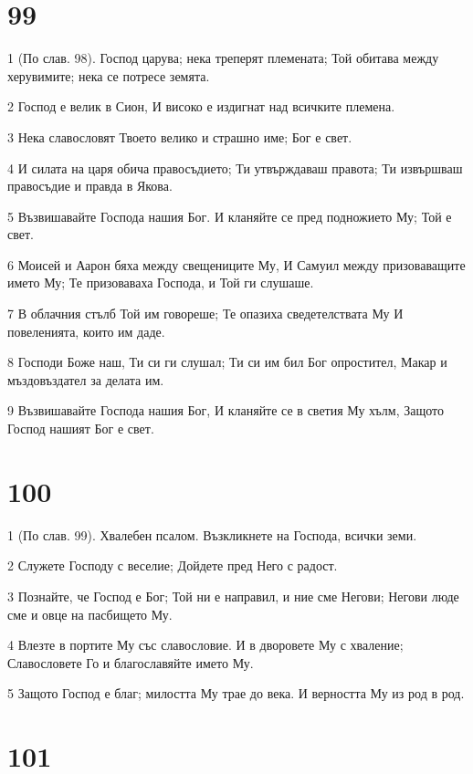\chapter{99}

\par 1 (По слав. 98). Господ царува; нека треперят племената; Той обитава между херувимите; нека се потресе земята.
\par 2 Господ е велик в Сион, И високо е издигнат над всичките племена.
\par 3 Нека славословят Твоето велико и страшно име; Бог е свет.
\par 4 И силата на царя обича правосъдието; Ти утвърждаваш правота; Ти извършваш правосъдие и правда в Якова.
\par 5 Възвишавайте Господа нашия Бог. И кланяйте се пред подножието Му; Той е свет.
\par 6 Моисей и Аарон бяха между свещениците Му, И Самуил между призоваващите името Му; Те призоваваха Господа, и Той ги слушаше.
\par 7 В облачния стълб Той им говореше; Те опазиха сведетелствата Му И повеленията, които им даде.
\par 8 Господи Боже наш, Ти си ги слушал; Ти си им бил Бог опростител, Макар и мъздовъздател за делата им.
\par 9 Възвишавайте Господа нашия Бог, И кланяйте се в светия Му хълм, Защото Господ нашият Бог е свет.

\chapter{100}

\par 1 (По слав. 99). Хвалебен псалом. Възкликнете на Господа, всички земи.
\par 2 Служете Господу с веселие; Дойдете пред Него с радост.
\par 3 Познайте, че Господ е Бог; Той ни е направил, и ние сме Негови; Негови люде сме и овце на пасбището Му.
\par 4 Влезте в портите Му със славословие. И в дворовете Му с хваление; Славословете Го и благославяйте името Му.
\par 5 Защото Господ е благ; милостта Му трае до века. И верността Му из род в род.

\chapter{101}

